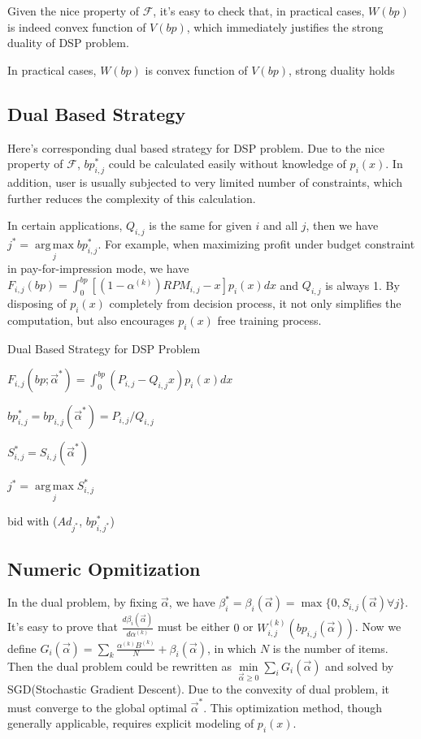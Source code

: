 \documentclass[sigconf]{acmart}
\DeclareMathOperator*{\argmax}{arg\,max}
\newcommand{\sbp}{bp_{i,j}}
\newcommand{\sW}{W_{i,j}^{(k)}}
\newcommand{\sB}{B^{(k)}}
\newcommand{\sRPM}{RPM_{i,j}}
\newcommand{\salpha}{\alpha^{(k)}}
\newcommand{\sbeta}{\beta_i}
\newcommand{\sF}{F_{i,j}}
\newcommand{\sS}{S_{i,j}}
\newcommand{\sG}{G_i}
\newcommand{\valpha}{\vec{\alpha}}
\newcommand{\uff}{\mathscr{F}}
\begin{document}
Given the nice property of $\uff$, it's easy to check that, in practical cases, $W(bp)$ is indeed convex function of $V(bp)$,
    which immediately justifies the strong duality of DSP problem.

\begin{theorem}
In practical cases, $W(bp)$ is convex function of $V(bp)$, strong duality holds
\end{theorem}

\subsection{Dual Based Strategy}

Here's corresponding dual based strategy for DSP problem.
Due to the nice property of $\uff$, $\sbp^*$ could be calculated easily without knowledge of $p_i(x)$.
In addition, user is usually subjected to very limited number of constraints, which further reduces the complexity of this calculation.

In certain applications, $Q_{i,j}$ is the same for given $i$ and all $j$, then we have $j^* = \argmax\limits_j \sbp^*$.
For example, when maximizing profit under budget constraint in pay-for-impression mode,
    we have $\sF(bp) = \int_0^{bp} [(1-\salpha)\sRPM-x]p_i(x)dx$ and $Q_{i,j}$ is always 1.
By disposing of $p_i(x)$ completely from decision process, it not only simplifies the computation,
    but also encourages $p_i(x)$ free training process.

\begin{algorithm}
\caption{Dual Based Strategy for DSP Problem}

{
  {
    $\sF(bp; \valpha^*) = \int_0^{bp} (P_{i,j}-Q_{i,j}x)p_i(x)dx$

    $\sbp^* = \sbp(\valpha^*) = P_{i,j}/Q_{i,j}$

    $\sS^* = \sS(\valpha^*)$
  }
  $j^* = \argmax\limits_j \sS^*$
  
   { bid with ($Ad_{j^*}$, $bp_{i,j^*}^*$) }
}
\end{algorithm}

\subsection{Numeric Opmitization}

In the dual problem, by fixing $\valpha$, we have $\sbeta^* = \sbeta(\valpha) = \max \{ 0, \sS(\valpha) \forall j \}$.
It's easy to prove that $\frac{d\sbeta(\valpha)}{d\salpha}$ must be either $0$ or $\sW(\sbp(\valpha))$.
Now we define $\sG(\valpha) = \sum\limits_k \frac{\salpha \sB}{N} + \sbeta(\valpha)$, in which $N$ is the number of items.
Then the dual problem could be rewritten as $\min\limits_{\valpha \ge 0} \sum\limits_i \sG(\valpha)$
    and solved by SGD(Stochastic Gradient Descent).
Due to the convexity of dual problem, it must converge to the global optimal $\valpha^*$.
This optimization method, though generally applicable, requires explicit modeling of $p_i(x)$.
\end{document}

